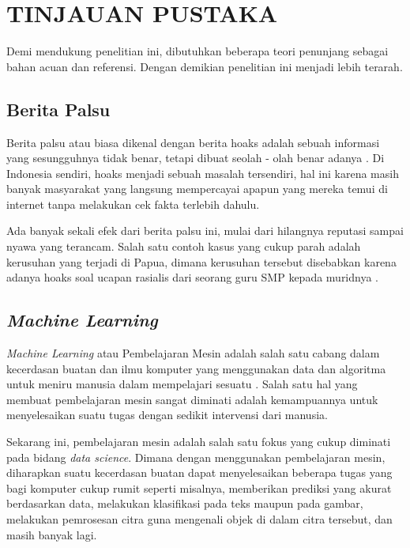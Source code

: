\chapter{TINJAUAN PUSTAKA}
\label{chap:tinjauanpustaka}

Demi mendukung penelitian ini, dibutuhkan beberapa teori penunjang sebagai bahan acuan dan referensi. Dengan demikian penelitian ini menjadi lebih terarah.

\section{Berita Palsu}
\label{sec:beritapalsu}

Berita palsu atau biasa dikenal dengan berita hoaks adalah sebuah informasi yang sesungguhnya tidak benar, tetapi dibuat seolah - olah benar adanya \cite{berita_bohong}. Di Indonesia sendiri, hoaks menjadi sebuah masalah tersendiri, hal ini karena masih banyak masyarakat yang langsung mempercayai apapun yang mereka temui di internet tanpa melakukan cek fakta terlebih dahulu.

Ada banyak sekali efek dari berita palsu ini, mulai dari hilangnya reputasi sampai nyawa yang terancam. Salah satu contoh kasus yang cukup parah adalah kerusuhan yang terjadi di Papua, dimana kerusuhan tersebut disebabkan karena adanya hoaks soal ucapan rasialis dari seorang guru SMP kepada muridnya \cite{efek_hoax}.

\section{\textit{Machine Learning}}

\textit{Machine Learning} atau Pembelajaran Mesin adalah salah satu cabang dalam kecerdasan buatan dan ilmu komputer yang menggunakan data dan algoritma untuk meniru manusia dalam mempelajari sesuatu \cite{ibm_ml_expl}. Salah satu hal yang membuat pembelajaran mesin sangat diminati adalah kemampuannya untuk menyelesaikan suatu tugas dengan sedikit intervensi dari manusia.

Sekarang ini, pembelajaran mesin adalah salah satu fokus yang cukup diminati pada bidang \textit{data science}. Dimana dengan menggunakan pembelajaran mesin, diharapkan suatu kecerdasan buatan dapat menyelesaikan beberapa tugas yang bagi komputer cukup rumit seperti misalnya, memberikan prediksi yang akurat berdasarkan data, melakukan klasifikasi pada teks maupun pada gambar, melakukan pemrosesan citra guna mengenali objek di dalam citra tersebut, dan masih banyak lagi.

